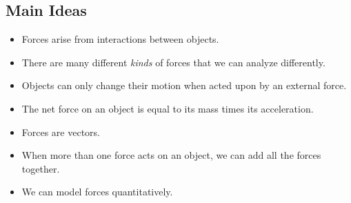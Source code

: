 \documentclass[]{article}
\begin{document}
\begin{PresentSpace}
\section*{Main Ideas}
\begin{itemize}
	\item Forces arise from interactions between objects.
	\item There are many different \textit{kinds} of forces that we can analyze differently.
	\item Objects can only change their motion when acted upon by an external force.
	\item The net force on an object is equal to its mass times its acceleration.
	\item Forces are vectors.
	\item When more than one force acts on an object, we can add all the forces together.
	\item We can model forces quantitatively.
\end{itemize}
\end{PresentSpace}
\end{document}
